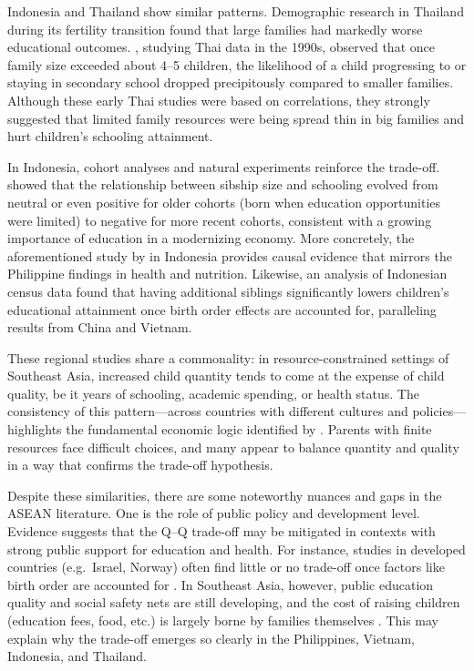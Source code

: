 \documentclass[]{AEA}
\begin{document}
Indonesia and Thailand show similar patterns. Demographic research in
Thailand during its fertility transition found that large families had
markedly worse educational outcomes. \citet{knodel1990family}, studying
Thai data in the 1990s, observed that once family size exceeded about
4--5 children, the likelihood of a child progressing to or staying in
secondary school dropped precipitously compared to smaller families.
Although these early Thai studies were based on correlations, they
strongly suggested that limited family resources were being spread thin
in big families and hurt children's schooling attainment.

In Indonesia, cohort analyses and natural experiments reinforce the
trade-off. \citet{maralani2008changing} showed that the relationship
between sibship size and schooling evolved from neutral or even positive
for older cohorts (born when education opportunities were limited) to
negative for more recent cohorts, consistent with a growing importance
of education in a modernizing economy. More concretely, the
aforementioned study by \citet{hatton2018fertility} in Indonesia
provides causal evidence that mirrors the Philippine findings in health
and nutrition. Likewise, an analysis of Indonesian census data
\citep{feng2021effect} found that having additional siblings
significantly lowers children's educational attainment once birth order
effects are accounted for, paralleling results from China and Vietnam.

These regional studies share a commonality: in resource-constrained
settings of Southeast Asia, increased child quantity tends to come at
the expense of child quality, be it years of schooling, academic
spending, or health status. The consistency of this pattern---across
countries with different cultures and policies---highlights the
fundamental economic logic identified by \citet{becker1973interaction}.
Parents with finite resources face difficult choices, and many appear to
balance quantity and quality in a way that confirms the trade-off
hypothesis.

Despite these similarities, there are some noteworthy nuances and gaps
in the ASEAN literature. One is the role of public policy and
development level. Evidence suggests that the Q--Q trade-off may be
mitigated in contexts with strong public support for education and
health. For instance, studies in developed countries (e.g.~Israel,
Norway) often find little or no trade-off once factors like birth order
are accounted for
\citep{black2005more, kristensen2010educational, angrist2010multiple}.
In Southeast Asia, however, public education quality and social safety
nets are still developing, and the cost of raising children (education
fees, food, etc.) is largely borne by families themselves
\citep{oecd2024sigi}. This may explain why the trade-off emerges so
clearly in the Philippines, Vietnam, Indonesia, and Thailand.
\end{document}
